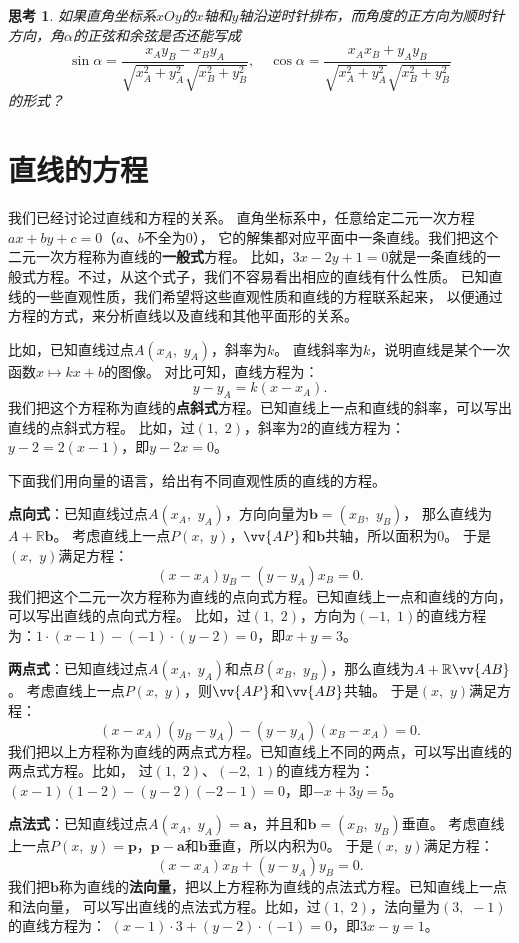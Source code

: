 \documentclass[12pt,UTF8]{ctexbook}
\theoremstyle{definition}
\theoremstyle{plain}
\newtheorem{sk}{思考}[section]
\begin{document}
\begin{sk}
    如果直角坐标系$xOy$的$x$轴和$y$轴沿逆时针排布，而角度的正方向为顺时针方向，角$\alpha$的正弦和余弦是否还能写成
    $$ \sin \alpha = \frac{x_Ay_B - x_By_A}{\sqrt{x_A^2 + y_A^2}\sqrt{x_B^2 + y_B^2}}, \quad \cos \alpha = \frac{x_Ax_B + y_Ay_B}{\sqrt{x_A^2 + y_A^2} \sqrt{x_B^2 + y_B^2}}$$
    的形式？
\end{sk}

\section{直线的方程}
我们已经讨论过直线和方程的关系。
直角坐标系中，任意给定二元一次方程$ax + by + c = 0$（$a$、$b$不全为$0$），
它的解集都对应平面中一条直线。我们把这个二元一次方程称为直线的\textbf{一般式}方程。
比如，$3x - 2y + 1 = 0$就是一条直线的一般式方程。不过，从这个式子，我们不容易看出相应的直线有什么性质。
已知直线的一些直观性质，我们希望将这些直观性质和直线的方程联系起来，
以便通过方程的方式，来分析直线以及直线和其他平面形的关系。

比如，已知直线过点$A(x_A,\,\, y_A)$，斜率为$k$。
直线斜率为$k$，说明直线是某个一次函数$x \mapsto kx + b$的图像。
对比可知，直线方程为：
$$y - y_A = k(x - x_A).$$
我们把这个方程称为直线的\textbf{点斜式}方程。已知直线上一点和直线的斜率，可以写出直线的点斜式方程。
比如，过$(1,\,\,2)$，斜率为$2$的直线方程为：$y - 2 = 2(x - 1)$，即$y - 2x = 0$。

下面我们用向量的语言，给出有不同直观性质的直线的方程。

\textbf{点向式}：已知直线过点$A(x_A,\,\, y_A)$，方向向量为$\mathbf{b} = (x_B,\,\, y_B)$，
那么直线为$A + \mathbb{R}\mathbf{b}$。
考虑直线上一点$P(x,\,\, y)$，$\vv{AP}$和$\mathbf{b}$共轴，所以面积为$0$。
于是$(x,\,\,y)$满足方程：
$$(x - x_A) y_B - (y - y_A) x_B = 0.$$
我们把这个二元一次方程称为直线的点向式方程。已知直线上一点和直线的方向，可以写出直线的点向式方程。
比如，过$(1,\,\,2)$，方向为$(-1,\,\,1)$的直线方程为：$1\cdot(x - 1) - (-1)\cdot(y - 2) = 0$，即$x + y = 3$。

\textbf{两点式}：已知直线过点$A(x_A,\,\, y_A)$和点$B(x_B,\,\, y_B)$，那么直线为$A + \mathbb{R}\vv{AB}$。
考虑直线上一点$P(x,\,\, y)$，则$\vv{AP}$和$\vv{AB}$共轴。
于是$(x,\,\,y)$满足方程：
$$(x - x_A) (y_B - y_A) - (y - y_A) (x_B - x_A) = 0.$$
我们把以上方程称为直线的两点式方程。已知直线上不同的两点，可以写出直线的两点式方程。比如，
过$(1,\,\,2)$、$(-2,\,\,1)$的直线方程为：$(x - 1)(1 - 2) - (y - 2)(-2 - 1) = 0$，即$-x + 3y = 5$。

\textbf{点法式}：已知直线过点$A(x_A,\,\, y_A) = \mathbf{a}$，并且和$\mathbf{b} = (x_B,\,\, y_B)$垂直。
考虑直线上一点$P(x,\,\, y) = \mathbf{p}$，$\mathbf{p} - \mathbf{a}$和$\mathbf{b}$垂直，所以内积为$0$。
于是$(x,\,\,y)$满足方程：
$$(x - x_A) x_B + (y - y_A) y_B = 0.$$
我们把$\mathbf{b}$称为直线的\textbf{法向量}，把以上方程称为直线的点法式方程。已知直线上一点和法向量，
可以写出直线的点法式方程。比如，过$(1,\,\,2)$，法向量为$(3,\,\,-1)$的直线方程为：
$(x - 1)\cdot 3 + (y - 2)\cdot (-1) = 0$，即$3x - y= 1$。
\end{document}
